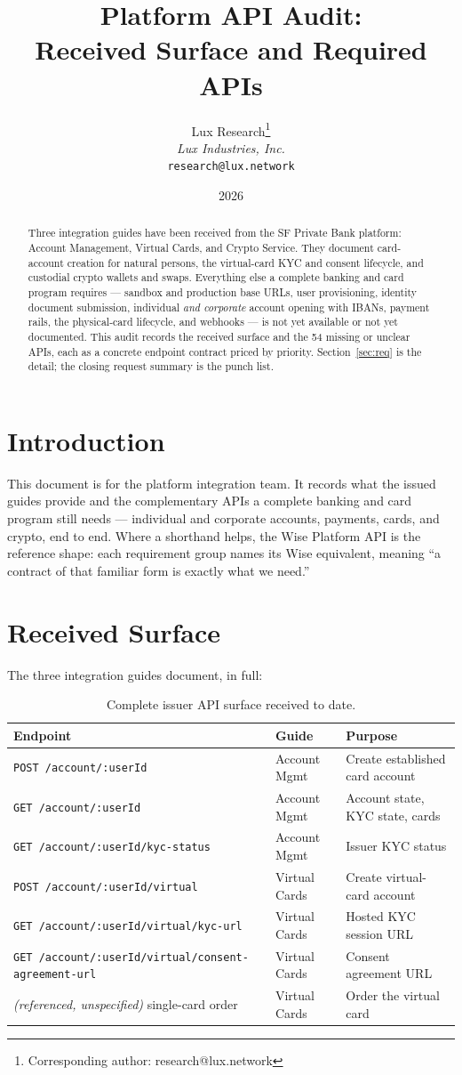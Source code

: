 \documentclass[11pt]{article}
\title{Platform API Audit:\\Received Surface and Required APIs}
\author{
Lux Research\thanks{Corresponding author: research@lux.network}\\
\textit{Lux Industries, Inc.}\\
\texttt{research@lux.network}
}
\date{2026}
\newcommand{\ep}[1]{\texttt{\small #1}}
\begin{document}
\luxcoverpage

\begin{abstract}
Three integration guides have been received from the SF Private Bank platform: Account Management, Virtual Cards, and Crypto Service. They document card-account creation for natural persons, the virtual-card KYC and consent lifecycle, and custodial crypto wallets and swaps. Everything else a complete banking and card program requires --- sandbox and production base URLs, user provisioning, identity document submission, individual \emph{and corporate} account opening with IBANs, payment rails, the physical-card lifecycle, and webhooks --- is not yet available or not yet documented. This audit records the received surface and the 54 missing or unclear APIs, each as a concrete endpoint contract priced by priority. Section~\ref{sec:req} is the detail; the closing request summary is the punch list.
\end{abstract}

\section{Introduction}

This document is for the platform integration team. It records what
the issued guides provide and the complementary APIs a complete
banking and card program still needs --- individual and corporate
accounts, payments, cards, and crypto, end to end. Where a shorthand
helps, the Wise Platform API is the reference shape: each requirement
group names its Wise equivalent, meaning ``a contract of that
familiar form is exactly what we need.''

\section{Received Surface}

The three integration guides document, in full:

\begin{table}[H]
\centering
\small
\begin{tabular}{@{}lll@{}}
\toprule
\textbf{Endpoint} & \textbf{Guide} & \textbf{Purpose} \\
\midrule
\ep{POST /account/:userId} & Account Mgmt & Create established card account \\
\ep{GET /account/:userId} & Account Mgmt & Account state, KYC state, cards \\
\ep{GET /account/:userId/kyc-status} & Account Mgmt & Issuer KYC status \\
\ep{POST /account/:userId/virtual} & Virtual Cards & Create virtual-card account \\
\ep{GET /account/:userId/virtual/kyc-url} & Virtual Cards & Hosted KYC session URL \\
\ep{GET /account/:userId/virtual/consent-agreement-url} & Virtual Cards & Consent agreement URL \\
\emph{(referenced, unspecified)} single-card order & Virtual Cards & Order the virtual card \\
\bottomrule
\end{tabular}
\caption{Complete issuer API surface received to date.}
\end{table}
\end{document}
